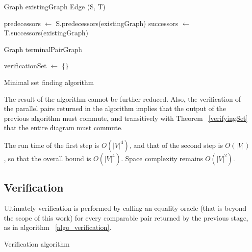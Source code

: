 \documentclass[sigplan,review,anonymous]{acmart}
\begin{document}
{\begin{algorithm}
\DontPrintSemicolon
{}
Graph existingGraph\;
Edge (S, T)\;
        
predecessors $\gets$ S.predecessors(existingGraph)\;
successors $\gets$ T.successors(existingGraph)\;

Graph terminalPairGraph\;

verificationSet $\gets$ \{\}\;
\;
\caption{Minimal set finding algorithm}
\label{algo_online_minimal}
\end{algorithm}

The result of the algorithm cannot be further reduced.
Also, the verification of the parallel pairs returned in the algorithm implies that the output of the previous algorithm must commute, and transitively with Theorem ~\ref{verifyingSet} that the entire diagram must commute.

The run time of the first step is $O(|V|^4)$, and that of the second step is $O(|V|)$, so that the overall bound is $O(|V|^4)$.
Space complexity remains $O(|V|^2)$.

\subsection{Verification}
Ultimately verification is performed by calling an equality oracle (that is beyond the scope of this work) for every comparable pair returned by the previous stage, as in algorithm ~\ref{algo_verification}.

\begin{algorithm}
\DontPrintSemicolon
{}
\;
\caption{Verification algorithm}\label{algo_verification}
\end{algorithm}

}
\end{document}

